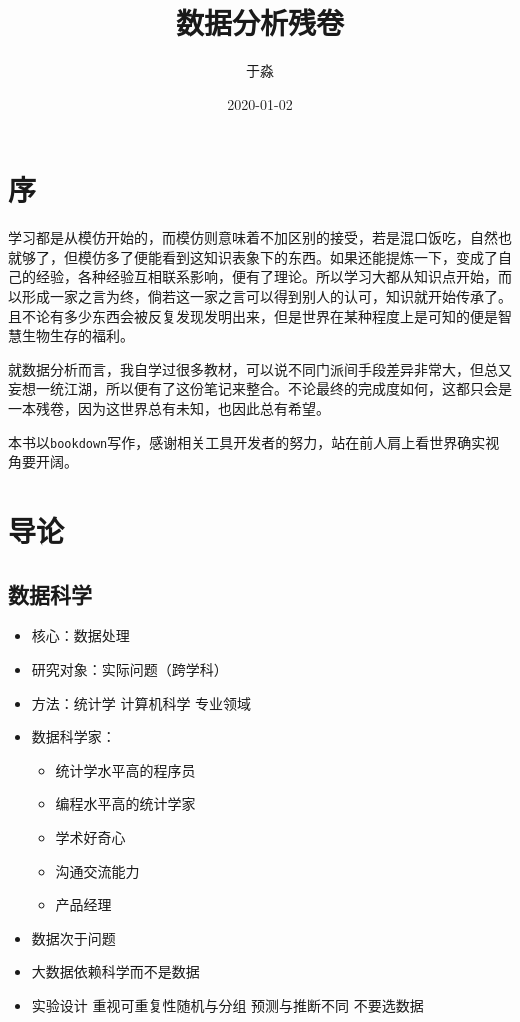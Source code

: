 \documentclass[]{book}
\title{数据分析残卷}
\author{于淼}
\date{2020-01-02}
\providecommand{\tightlist}{%
  \setlength{\itemsep}{0pt}\setlength{\parskip}{0pt}}
\begin{document}
\maketitle

{
\setcounter{tocdepth}{1}
\tableofcontents
}
\hypertarget{ux5e8f}{%
\chapter*{序}\label{ux5e8f}}

学习都是从模仿开始的，而模仿则意味着不加区别的接受，若是混口饭吃，自然也就够了，但模仿多了便能看到这知识表象下的东西。如果还能提炼一下，变成了自己的经验，各种经验互相联系影响，便有了理论。所以学习大都从知识点开始，而以形成一家之言为终，倘若这一家之言可以得到别人的认可，知识就开始传承了。且不论有多少东西会被反复发现发明出来，但是世界在某种程度上是可知的便是智慧生物生存的福利。

就数据分析而言，我自学过很多教材，可以说不同门派间手段差异非常大，但总又妄想一统江湖，所以便有了这份笔记来整合。不论最终的完成度如何，这都只会是一本残卷，因为这世界总有未知，也因此总有希望。

本书以\texttt{bookdown}写作，感谢相关工具开发者的努力，站在前人肩上看世界确实视角要开阔。

\hypertarget{intro}{%
\chapter{导论}\label{intro}}

\hypertarget{ux6570ux636eux79d1ux5b66}{%
\section{数据科学}\label{ux6570ux636eux79d1ux5b66}}

\begin{itemize}
\tightlist
\item
  核心：数据处理
\item
  研究对象：实际问题（跨学科）
\item
  方法：统计学 计算机科学 专业领域
\item
  数据科学家：

  \begin{itemize}
  \tightlist
  \item
    统计学水平高的程序员
  \item
    编程水平高的统计学家
  \item
    学术好奇心
  \item
    沟通交流能力
  \item
    产品经理
  \end{itemize}
\item
  数据次于问题
\item
  大数据依赖科学而不是数据
\item
  实验设计 重视可重复性随机与分组 预测与推断不同 不要选数据
\end{itemize}
\end{document}
